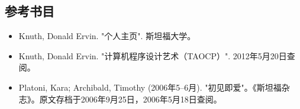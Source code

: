 \subsection{参考书目} 
\begin{itemize}
\item Knuth, Donald Ervin. "个人主页". 斯坦福大学。  
\item Knuth, Donald Ervin. "计算机程序设计艺术（TAOCP）". 2012年5月20日查阅。  
\item Platoni, Kara; Archibald, Timothy (2006年5–6月). "初见即爱"。《斯坦福杂志》。原文存档于2006年9月25日，2006年5月18日查阅。
\end{itemize}